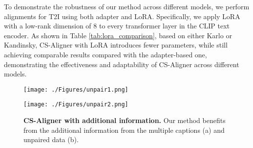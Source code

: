 To demonstrate the robustness of our method across different models, we perform alignments for T2I using both adapter and LoRA.
Specifically, we apply LoRA with a low-rank dimension of 8 to every transformer layer in the CLIP text encoder.
As shown in Table \ref{tab:lora_comparison}, based on either Karlo or Kandinsky, CS-Aligner with LoRA introduces fewer parameters, while still achieving comparable results compared with the adapter-based one, demonstrating the effectiveness and adaptability of CS-Aligner across different models.




\begin{figure}[t] %
    \centering
    \begin{minipage}{0.24\textwidth}
        \centering
\texttt{[image: ./Figures/unpair1.png]}
        \vspace{-6mm}
        \label{fig:multicaptions}
    \end{minipage}%
    \hfill
    \begin{minipage}{0.24\textwidth}
        \centering        \texttt{[image: ./Figures/unpair2.png]}
        \vspace{-6mm}
        \label{fig:unpairdata}
    \end{minipage}
\vspace{-2.5mm}
\caption{\textbf{ 
CS-Aligner with additional information.} Our method benefits from the additional information from the multiple captions (a) and unpaired data (b). 
}
\vspace{-4mm}
\end{figure}

